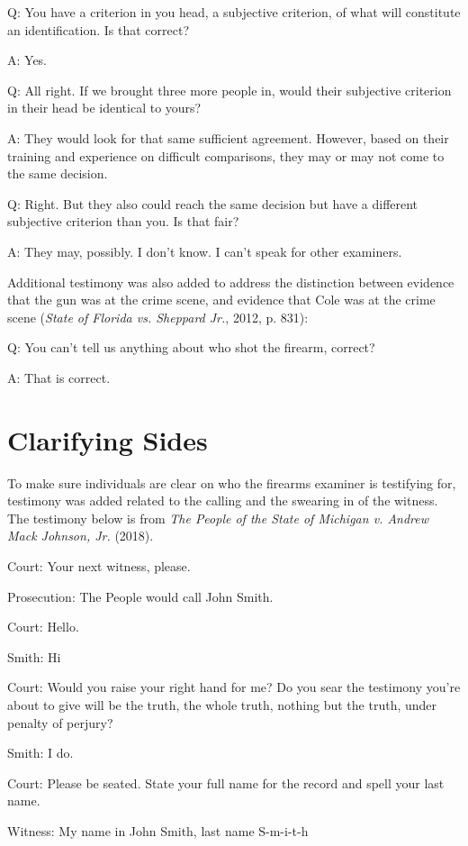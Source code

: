 \documentclass[print]{nuthesis}
\begin{document}
Q: You have a criterion in you head, a subjective criterion, of what will constitute an identification. Is that correct?

A: Yes.

Q: All right. If we brought three more people in, would their subjective criterion in their head be identical to yours?

A: They would look for that same sufficient agreement. However, based on their training and experience on difficult comparisons, they may or may not come to the same decision.

Q: Right. But they also could reach the same decision but have a different subjective criterion than you. Is that fair?

A: They may, possibly. I don't know. I can't speak for other examiners.

Additional testimony was also added to address the distinction between evidence that the gun was at the crime scene, and evidence that Cole was at the crime scene (\emph{State of {Florida} vs. Sheppard {Jr.}}, 2012, p. 831):

Q: You can't tell us anything about who shot the firearm, correct?

A: That is correct.

\hypertarget{clarifying-sides}{%
\section{Clarifying Sides}\label{clarifying-sides}}

To make sure individuals are clear on who the firearms examiner is testifying for, testimony was added related to the calling and the swearing in of the witness. The testimony below is from \emph{The {People} of the {State} of {Michigan} v. Andrew {Mack} {Johnson}, {Jr.}} (2018).

Court: Your next witness, please.

Prosecution: The People would call John Smith.

Court: Hello.

Smith: Hi

Court: Would you raise your right hand for me? Do you sear the testimony you're about to give will be the truth, the whole truth, nothing but the truth, under penalty of perjury?

Smith: I do.

Court: Please be seated. State your full name for the record and spell your last name.

Witness: My name in John Smith, last name S-m-i-t-h
\end{document}

